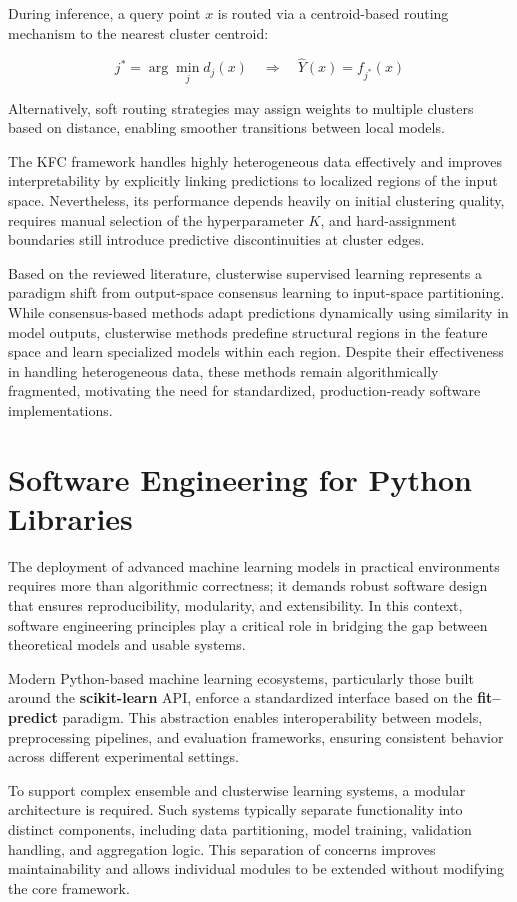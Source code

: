 During inference, a query point $x$ is routed via a centroid-based routing mechanism to the nearest cluster centroid:

\[    
    j^* = \arg\min_j d_j(x)
    \quad \Rightarrow \quad
    \hat{Y}(x) = f_{j^*}(x)
\]

Alternatively, soft routing strategies may assign weights to multiple clusters based on distance, enabling smoother transitions between local models.

The KFC framework handles highly heterogeneous data effectively and improves interpretability by explicitly linking predictions to localized regions of the input space. Nevertheless, its performance depends heavily on initial clustering quality, requires manual selection of the hyperparameter $K$, and hard-assignment boundaries still introduce predictive discontinuities at cluster edges.

Based on the reviewed literature, clusterwise supervised learning represents a paradigm shift from output-space consensus learning to input-space partitioning. While consensus-based methods adapt predictions dynamically using similarity in model outputs, clusterwise methods predefine structural regions in the feature space and learn specialized models within each region. Despite their effectiveness in handling heterogeneous data, these methods remain algorithmically fragmented, motivating the need for standardized, production-ready software implementations.

\section{Software Engineering for Python Libraries}

\hs The deployment of advanced machine learning models in practical environments requires more than algorithmic correctness; it demands robust software design that ensures reproducibility, modularity, and extensibility. In this context, software engineering principles play a critical role in bridging the gap between theoretical models and usable systems.

Modern Python-based machine learning ecosystems, particularly those built around the \textbf{scikit-learn} API, enforce a standardized interface based on the \textbf{fit--predict} paradigm. This abstraction enables interoperability between models, preprocessing pipelines, and evaluation frameworks, ensuring consistent behavior across different experimental settings.

To support complex ensemble and clusterwise learning systems, a modular architecture is required. Such systems typically separate functionality into distinct components, including data partitioning, model training, validation handling, and aggregation logic. This separation of concerns improves maintainability and allows individual modules to be extended without modifying the core framework.

